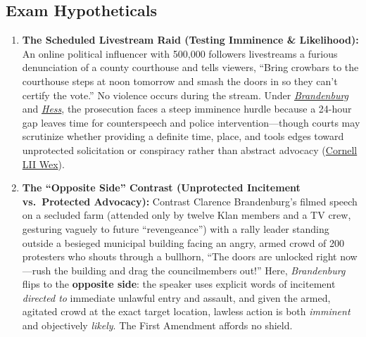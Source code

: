\documentclass[12pt]{article}
\begin{document}
\subsection*{Exam Hypotheticals}
\begin{enumerate}
  \item \textbf{The Scheduled Livestream Raid (Testing Imminence \& Likelihood):} An online political influencer with 500,000 followers livestreams a furious denunciation of a county courthouse and tells viewers, ``Bring crowbars to the courthouse steps at noon tomorrow and smash the doors in so they can't certify the vote.'' No violence occurs during the stream. Under \href{https://supreme.justia.com/cases/federal/us/395/444/}{\emph{Brandenburg}} and \href{https://supreme.justia.com/cases/federal/us/414/105/}{\emph{Hess}}, the prosecution faces a steep imminence hurdle because a 24-hour gap leaves time for counterspeech and police intervention---though courts may scrutinize whether providing a definite time, place, and tools edges toward unprotected solicitation or conspiracy rather than abstract advocacy (\href{https://www.law.cornell.edu/wex/imminent_lawless_action}{Cornell LII Wex}).
  \item \textbf{The ``Opposite Side'' Contrast (Unprotected Incitement vs.\ Protected Advocacy):} Contrast Clarence Brandenburg's filmed speech on a secluded farm (attended only by twelve Klan members and a TV crew, gesturing vaguely to future ``revengeance'') with a rally leader standing outside a besieged municipal building facing an angry, armed crowd of 200 protesters who shouts through a bullhorn, ``The doors are unlocked right now---rush the building and drag the councilmembers out!'' Here, \emph{Brandenburg} flips to the \textbf{opposite side}: the speaker uses explicit words of incitement \emph{directed to} immediate unlawful entry and assault, and given the armed, agitated crowd at the exact target location, lawless action is both \emph{imminent} and objectively \emph{likely}. The First Amendment affords no shield.
\end{enumerate}
\end{document}
